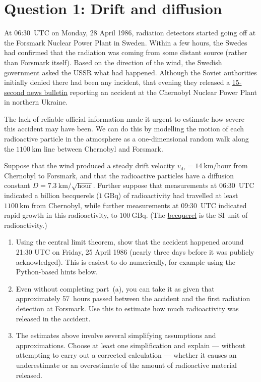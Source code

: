 \documentclass[12 pt]{article} %
\newcommand{\vdr}{\ensuremath{v_{\mathrm{dr}}} }
\newcommand{\showmarks}[1]{\rightline{\texttt{[#1 marks]}}} %
\begin{document}
\vfill
\section*{Question 1: Drift and diffusion}
At 06:30~UTC on Monday, 28 April 1986, radiation detectors started going off at the Forsmark Nuclear Power Plant in Sweden.
Within a few hours, the Swedes had confirmed that the radiation was coming from some distant source (rather than Forsmark itself).
Based on the direction of the wind, the Swedish government asked the USSR what had happened.
Although the Soviet authorities initially denied there had been any incident, that evening they released a \href{https://www.youtube.com/watch?v=sC7n_QgJRks}{15-second news bulletin} reporting an accident at the Chernobyl Nuclear Power Plant in northern Ukraine.

The lack of reliable official information made it urgent to estimate how severe this accident may have been.
We can do this by modelling the motion of each radioactive particle in the atmosphere as a one-dimensional random walk along the $1100~\mathrm{km}$ line between Chernobyl and Forsmark.

\newpage
Suppose that the wind produced a steady drift velocity $\vdr = 14~\mathrm{km}/\mathrm{hour}$ from Chernobyl to Forsmark, and that the radioactive particles have a diffusion constant $D = 7.3~\mathrm{km}/\sqrt{\mathrm{hour}}$.
Further suppose that measurements at 06:30~UTC indicated a billion becquerels ($1~\mathrm{GBq}$) of radioactivity had travelled at least $1100~\mathrm{km}$ from Chernobyl, while further measurements at 09:30~UTC indicated rapid growth in this radioactivity, to $100~\mathrm{GBq}$.
(The \href{https://en.wikipedia.org/wiki/Becquerel}{becquerel} is the SI unit of radioactivity.)

\begin{enumerate}[label={(\alph*)}]
  \item Using the central limit theorem, show that the accident happened around 21:30 UTC on Friday, 25 April 1986 (nearly three days before it was publicly acknowledged).
        This is easiest to do numerically, for example using the Python-based hints below.

  \showmarks{10}

  \item Even without completing part~(a), you can take it as given that approximately 57~hours passed between the accident and the first radiation detection at Forsmark.
        Use this to estimate how much radioactivity was released in the accident.

  \showmarks{10}

  \item The estimates above involve several simplifying assumptions and approximations.
        Choose at least one simplification and explain --- without attempting to carry out a corrected calculation --- whether it causes an underestimate or an overestimate of the amount of radioactive material released.

  \showmarks{6}
\end{enumerate}
\end{document}
